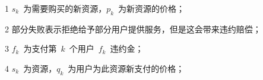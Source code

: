 \begin{table}[htbp]
\begin{threeparttable}
\begin{tabular}{lllllll}
        \end{tabular}%
        \begin{tablenotes}
            \item[1] $s_k$~为需要购买的新资源，$p_k$~为新资源的价格；
            \item[2] 部分失败表示拒绝给予部分用户提供服务，但是这会带来违约赔偿；
            \item[3] $f_k$~为支付第~$k$~个用户~$f_k$~违约金；
            \item[4] $s_k$~为资源，$q_k$~为用户为此资源新支付的价格；
        \end{tablenotes}
    \end{threeparttable}
\end{table}%

%
%
%
%
%


